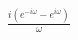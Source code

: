 \documentclass[preview]{standalone}
\begin{document}
\begin{align*}
\frac{i(e^{-i\omega}-e^{i\omega})}{\omega}
\end{align*}
\end{document}
